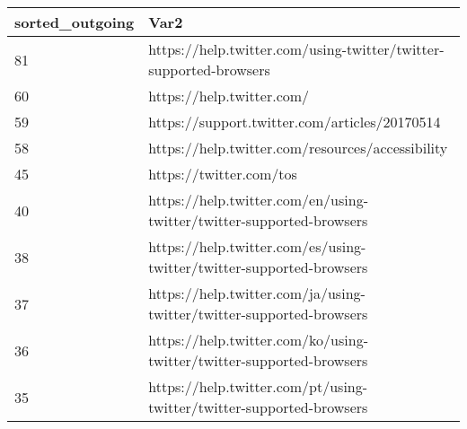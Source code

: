\begin{tabular}{ll}
sorted_outgoing & Var2 \\ 
\hline 
81 & https://help.twitter.com/using-twitter/twitter-supported-browsers \\ 
60 & https://help.twitter.com/ \\ 
59 & https://support.twitter.com/articles/20170514 \\ 
58 & https://help.twitter.com/resources/accessibility \\ 
45 & https://twitter.com/tos \\ 
40 & https://help.twitter.com/en/using-twitter/twitter-supported-browsers \\ 
38 & https://help.twitter.com/es/using-twitter/twitter-supported-browsers \\ 
37 & https://help.twitter.com/ja/using-twitter/twitter-supported-browsers \\ 
36 & https://help.twitter.com/ko/using-twitter/twitter-supported-browsers \\ 
35 & https://help.twitter.com/pt/using-twitter/twitter-supported-browsers \\ 
\hline 
\end{tabular}